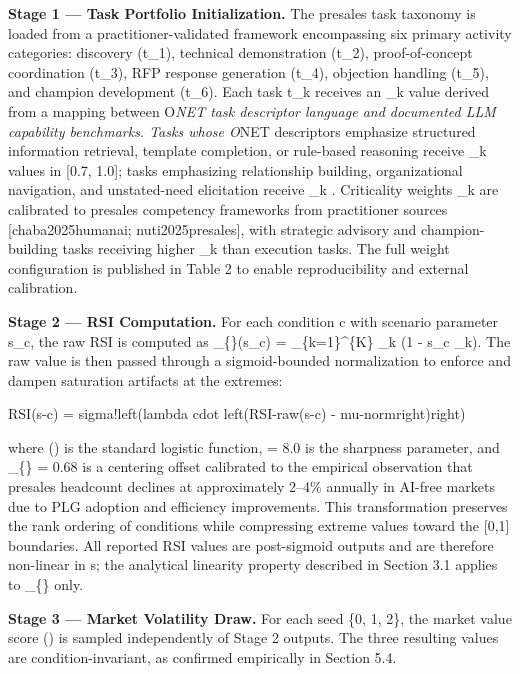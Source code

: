 \documentclass[10pt, conference]{IEEEtran}
\begin{document}
{\textbf{Stage 1 --- Task Portfolio Initialization.} The presales task taxonomy is loaded from a practitioner-validated framework encompassing six primary activity categories: discovery (t\_1), technical demonstration (t\_2), proof-of-concept coordination (t\_3), RFP response generation (t\_4), objection handling (t\_5), and champion development (t\_6). Each task t\_k receives an \alpha\_k value derived from a mapping between O\textit{NET task descriptor language and documented LLM capability benchmarks. Tasks whose O}NET descriptors emphasize structured information retrieval, template completion, or rule-based reasoning receive \alpha\_k values in [0.7, 1.0]; tasks emphasizing relationship building, organizational navigation, and unstated-need elicitation receive \alpha\_k \in [0.05, 0.30]. Criticality weights \beta\_k are calibrated to presales competency frameworks from practitioner sources [chaba2025humanai; nuti2025presales], with strategic advisory and champion-building tasks receiving higher \beta\_k than execution tasks. The full weight configuration is published in Table 2 to enable reproducibility and external calibration.

\textbf{Stage 2 --- RSI Computation.} For each condition c with scenario parameter s\_c, the raw RSI is computed as \_\{\}(s\_c) = \sum\_\{k=1\}\textasciicircum{}\{K\} \beta\_k (1 - s\_c \alpha\_k). The raw value is then passed through a sigmoid-bounded normalization to enforce  \in [0,1] and dampen saturation artifacts at the extremes:

RSI(s-c) = sigma!left(lambda cdot left(RSI-raw(s-c) - mu-normright)right)

where \sigma(\cdot) is the standard logistic function, \lambda = 8.0 is the sharpness parameter, and \mu\_\{\} = 0.68 is a centering offset calibrated to the empirical observation that presales headcount declines at approximately 2--4\% annually in AI-free markets due to PLG adoption and efficiency improvements. This transformation preserves the rank ordering of conditions while compressing extreme values toward the [0,1] boundaries. All reported RSI values are post-sigmoid outputs and are therefore non-linear in s; the analytical linearity property described in Section 3.1 applies to \_\{\} only.

\textbf{Stage 3 --- Market Volatility Draw.} For each seed \xi \in \{0, 1, 2\}, the market value score (\xi) is sampled independently of Stage 2 outputs. The three resulting values are condition-invariant, as confirmed empirically in Section 5.4.

}
\end{document}
